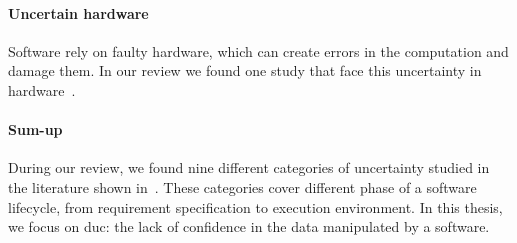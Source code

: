 \paragraph{Uncertain hardware}
Software rely on faulty hardware, which can create errors in the computation and damage them.
In our review we found one study that face this uncertainty in hardware~\cite{DBLP:conf/oopsla/CarbinMR13}.

\paragraph{Sum-up}
During our review, we found nine different categories of uncertainty studied in the literature shown in~.
These categories cover different phase of a software lifecycle, from requirement specification to execution environment.
In this thesis, we focus on \gls{duc}: the lack of confidence in the data manipulated by a software.

